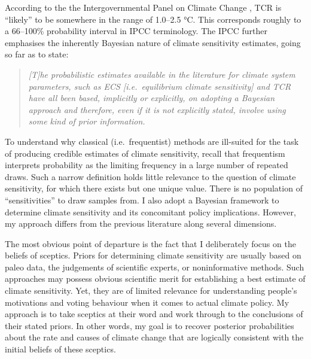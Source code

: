 \documentclass[smallextended]{svjour3}       %
\begin{document}
According to the the Intergovernmental Panel on Climate Change
\cite{ipcc2013i}, TCR is ``likely'' to be somewhere in the range of
1.0--2.5 °C. This corresponds roughly to a 66--100\% probability
interval in IPCC terminology. The IPCC further emphasises the inherently
Bayesian nature of climate sensitivity estimates, going so far as to
state:

\begin{quote}
\emph{{[}T{]}he probabilistic estimates available in the literature for
climate system parameters, such as ECS {[}i.e.~equilibrium climate
sensitivity{]} and TCR have all been based, implicitly or explicitly, on
adopting a Bayesian approach and therefore, even if it is not explicitly
stated, involve using some kind of prior information.}
\cite[p. 922]{ipcc2013i}
\end{quote}

To understand why classical (i.e.~frequentist) methods are ill-suited
for the task of producing credible estimates of climate sensitivity,
recall that frequentism interprets probability as the limiting frequency
in a large number of repeated draws. Such a narrow definition holds
little relevance to the question of climate sensitivity, for which there
exists but one unique value. There is no population of ``sensitivities''
to draw samples from. I also adopt a Bayesian framework to determine
climate sensitivity and its concomitant policy implications. However, my
approach differs from the previous literature along several dimensions.

The most obvious point of departure is the fact that I deliberately
focus on the beliefs of sceptics. Priors for determining climate
sensitivity are usually based on paleo data, the judgements of
scientific experts, or noninformative methods. Such approaches may
possess obvious scientific merit for establishing a best estimate of
climate sensitivity. Yet, they are of limited relevance for
understanding people's motivations and voting behaviour when it comes to
actual climate policy. My approach is to take sceptics at their word and
work through to the conclusions of their stated priors. In other words,
my goal is to recover posterior probabilities about the rate and causes
of climate change that are logically consistent with the initial beliefs
of these sceptics.
\end{document}
